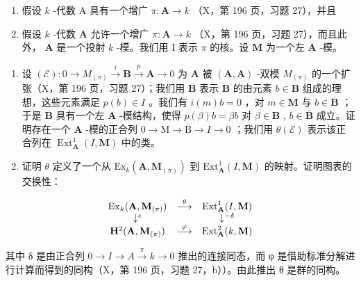 \begin{enumerate}
\def\labelenumi{\arabic{enumi})}
\setcounter{enumi}{1}
\item
  假设 \(k\) -代数 A 具有一个增广 \(\pi:\mathbf{A}\to k\) （X，第 196 页，习题 27），并且
\item
  假设 \(k\) -代数 \(\mathbf{A}\) 允许一个增广 \(\pi : \mathbf{A} \to k\) （X，第 196 页，习题 27），而且此外， \(\mathbf{A}\) 是一个投射 \(k\) -模。我们用 I 表示 \(\pi\) 的核。设 \(\mathbf{M}\) 为一个左 \(\mathbf{A}\) -模。
\end{enumerate}

\begin{enumerate}
\def\labelenumi{\alph{enumi})}
\item
  设 \((\mathcal{E}):0\to M_{(\pi)}\stackrel{i}{\to}\mathbf{B}\stackrel{p}{\to}\mathbf{A}\to 0\) 为 \(\mathbf{A}\) 被 \((\mathbf{A},\mathbf{A})\) -双模 \(M_{(\pi)}\) 的一个扩张（X，第 196 页，习题 27）；我们用 \(\overline{\mathbf{B}}\) 表示 \(\mathbf{B}\) 的由元素 \(b\in \mathbf{B}\) 组成的理想，这些元素满足 \(p(b)\in I\) 。我们有 \(i(m)b = 0\) ，对 \(m\in \mathbf{M}\) 与 \(b\in \overline{\mathbf{B}}\) ；于是 \(\overline{\mathbf{B}}\) 具有一个左 \(\mathbf{A}\) -模结构，使得 \(p(\beta)b = \beta b\) 对 \(\beta \in \mathbf{B}\) , \(b\in \overline{\mathbf{B}}\) 成立。证明存在一个 \(\mathbf{A}\) -模的正合列 \(0\to \mathrm{M}\to \overline{\mathrm{B}}\to I\to 0\) ；我们用 \(\theta (\mathcal{E})\) 表示该正合列在 \(\operatorname {Ext}_{\mathbf{A}}^{1}(I,\mathbf{M})\) 中的类。
\item
  证明 \(\theta\) 定义了一个从 \(\mathrm{Ex}_{k}(\mathbf{A},\mathbf{M}_{(\pi)})\) 到 \(\mathrm{Ext}_{\mathbf{A}}^{1}(I,\mathbf{M})\) 的映射。证明图表的交换性：
\end{enumerate}

\[
\begin{array}{c c c} \operatorname{Ex} _ {k} (\mathbf {A}, \mathbf {M} _ {(\pi)}) & \stackrel {{\theta}} {{\longrightarrow}} & \operatorname{Ext} _ {\mathbf {A}} ^ {1} (I, \mathbf {M}) \\ \downarrow^ {c} & & \downarrow^ {- \delta} \\ \mathbf {H} ^ {2} (\mathbf {A}, \mathbf {M} _ {(\pi)}) & \stackrel {{\varphi}} {{\longrightarrow}} & \operatorname{Ext} _ {\mathbf {A}} ^ {2} (k, \mathbf {M}) \end{array}
\]

其中 δ 是由正合列 \(0 \rightarrow I \rightarrow A \xrightarrow{\pi} k \rightarrow 0\) 推出的连接同态，而 φ 是借助标准分解进行计算而得到的同构（X，第 196 页，习题 27，b））。由此推出 θ 是群的同构。

